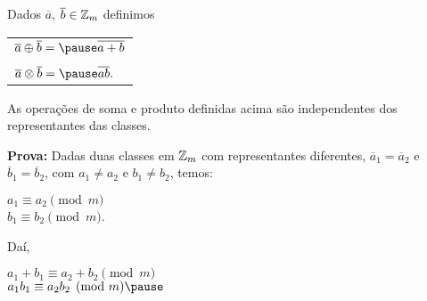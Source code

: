 \documentclass{beamer}
\begin{document}
    \begin{frame}
        \begin{definicao}
            Dados $\overline{a}$, $\overline{b} \in \mathbb{Z}_m$ definimos\pause
            \begin{center}
                \begin{tabular}{l}
                    $\overline{a}\oplus\overline{b} = \pause \overline{a + b}\label{soma_modulo_m}$\pause \\
                    \\
                    $\overline{a}\otimes\overline{b} = \pause \overline{ab}.\label{multiplicacao_modulo_m}$\pause
                \end{tabular}
            \end{center}
        \end{definicao}

        \begin{proposicao}
            As opera{\c c}{\~o}es de soma \pause e produto \pause definidas acima s{\~a}o independentes dos representantes das classes.\pause
        \end{proposicao}
        \noindent \textbf{Prova:}
            Dadas duas classes em $\mathbb{Z}_m$ com representantes diferentes, \pause $\overline{a}_{1} = \overline{a}_{2}$ e \pause $\overline{b}_{1} = \overline{b}_{2}$, \pause com $a_{1}\ne a_{2}$ \pause e $b_{1}\ne b_{2}$, \pause temos:\pause
            \begin{center}
                $a_1 \equiv a_2 \pmod m$\pause\\
                $b_1 \equiv b_2 \pmod m$.\pause
            \end{center}
            Daí,
            \begin{center}
                $a_1 + b_1 \equiv a_2 + b_2 \pmod m$\pause\\
                $a_1b_1 \equiv a_2b_2 \pmod m\pause$\\
            \end{center}
    \end{frame}
\end{document}
